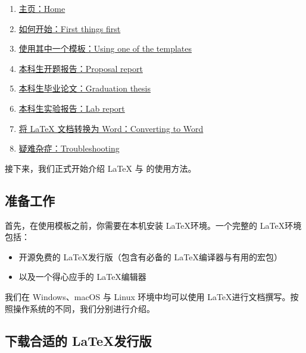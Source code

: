 \begin{enumerate}
  \item \href{https://bithesis.spencerwoo.com/Guide/}{主页：Home}
  \item \href{https://bithesis.spencerwoo.com/Guide/1-Intro/First-things-first}{如何开始：First things first }
  \item \href{https://bithesis.spencerwoo.com/Guide/2-Usage/Downloading-and-using-templates}{使用其中一个模板：Using one of the templates}
  \item \href{https://bithesis.spencerwoo.com/Guide/3-Templates/Proposal-Report}{本科生开题报告：Proposal report}
  \item \href{https://bithesis.spencerwoo.com/Guide/3-Templates/Final-Graduation-Thesis}{本科生毕业论文：Graduation thesis}
  \item \href{https://bithesis.spencerwoo.com/Guide/3-Templates/Lab-Report}{本科生实验报告：Lab report}
  \item \href{https://bithesis.spencerwoo.com/Guide/4-Others/Converting-to-Word}{将 LaTeX 文档转换为 Word：Converting to Word}
  \item \href{https://bithesis.spencerwoo.com/Guide/4-Others/Troubleshooting}{疑难杂症：Troubleshooting}
\end{enumerate}

接下来，我们正式开始介绍 {\LaTeX} 与 {\BIThesis} 的使用方法。

\subsection{准备工作}
首先，在使用模板之前，你需要在本机安装 \LaTeX 环境。一个完整的 \LaTeX 环境包括：

\begin{itemize}
  \item 开源免费的 \LaTeX 发行版（包含有必备的 \LaTeX 编译器与有用的宏包）
  \item 以及一个得心应手的 \LaTeX 编辑器
\end{itemize}

我们在 Windows、macOS 与 Linux 环境中均可以使用 \LaTeX 进行文档撰写。按照操作系统的不同，我们分别进行介绍。

\subsection{下载合适的 \LaTeX 发行版}


